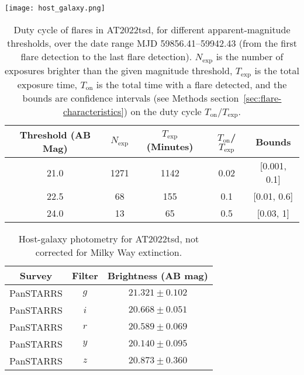 \documentclass{nature_plusfigure}
\newcommand{\at}{AT2022tsd}
\newcommand{\arcsec}{$^{\prime\prime}$}
\begin{document}
\begin{extended_data}
\begin{figure*}[!ht]
    \centering
    \texttt{[image: host\_galaxy.png]}
    \caption{\emph{Left:} The position of \at\ within its host galaxy ($r$-band image from Pan-STARRS). The transient is $\approx1.4$\arcsec\ from the center of the galaxy, which corresponds to $9\,$kpc at the redshift of the galaxy. \emph{Right:} The host galaxy of \at\ in the mass-SFR diagram for transient host galaxies\cite{Taggart2021}, including core-collapse supernovae\cite{Taggart2021}, long-duration $\gamma$-ray bursts\cite{Taggart2021}, and LFBOTs\cite{Perley2019,Ho2020_Koala,Coppejans2020,Perley2021,Yao2022}. }
    \label{fig:host-galaxy}
\end{figure*}

\begin{table}
\begin{center}
\caption{Duty cycle of flares in \at, for different apparent-magnitude thresholds, over the date range MJD 59856.41--59942.43 (from the first flare detection to the last flare detection). $N_\mathrm{exp}$ is the number of exposures brighter than the given magnitude threshold, $T_\mathrm{exp}$ is the total exposure time, $T_\mathrm{on}$ is the total time with a flare detected, and the bounds are confidence intervals (see Methods section~\ref{sec:flare-characteristics}) on the duty cycle $T_\mathrm{on}/T_\mathrm{exp}$. }
\label{tab:flare-stats}
\begin{tabular}{ccccc} 
\hline\hline
Threshold (AB Mag) & $N_\mathrm{exp}$ & $T_\mathrm{exp}$ (Minutes) & $T_\mathrm{on}$/$T_\mathrm{exp}$ & Bounds \\
\hline
21.0 & 1271 & 1142 & 0.02 & [0.001, 0.1] \\
22.5 & 68 & 155 & 0.1 & [0.01, 0.6]  \\
24.0 & 13 & 65 & 0.5 & [0.03, 1] \\
\hline
\end{tabular}
\end{center}
\end{table}

\begin{table}
\begin{center}
\caption{Host-galaxy photometry for \at, not corrected for Milky Way extinction.}
\label{tab:host-photometry}
\begin{tabular}{ccc} 
\hline\hline
Survey & Filter & Brightness (AB mag) \\
\hline
PanSTARRS & $g$               &$ 21.321 \pm 0.102 $\\
PanSTARRS & $i$               &$ 20.668 \pm 0.051 $\\
PanSTARRS & $r$               &$ 20.589 \pm 0.069 $\\
PanSTARRS & $y$               &$ 20.140 \pm 0.095 $\\
PanSTARRS& $z$               &$ 20.873 \pm 0.360 $\\
\hline
\end{tabular}
\end{center}
\end{table}


\end{extended_data}
\end{document}

